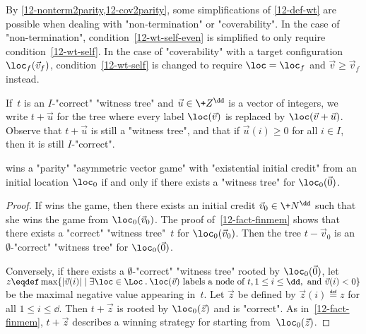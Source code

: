 \begin{remark}\label{12-rk-wt}
  By \cref{12-nonterm2parity,12-cov2parity}, some simplifications of
  \cref{12-def-wt} are possible when dealing with "non-termination" or
  "coverability". In the case of "non-termination",
  condition~\ref{12-wt-self-even} is simplified to only require
  condition~\ref{12-wt-self}.  In the case of "coverability" with a
  target configuration $\loc_f(\vec v_f)$, condition~\ref{12-wt-self}
  is changed to require $\loc=\loc_f$ and $\vec v\geq\vec v_f$
  instead.
\end{remark}

If~$t$ is an $I$-"correct" "witness tree" and $\vec u\in\+Z^\dd$ is a
vector of integers, we write $t+\vec u$ for the tree where
every label $\loc(\vec v)$ is replaced by $\loc(\vec v+\vec u)$.
Observe that $t+\vec u$ is still a "witness tree", and that if $\vec
u(i)\geq 0$ for all $i\in I$, then it is still $I$-"correct".

\begin{lemma}\label{12-lem-wt}
  \Eve wins a "parity" "asymmetric vector game" with "existential
  initial credit" from an initial location $\loc_0$ if and only if
  there exists a "witness tree" for $\loc_0(\vec 0)$.
\end{lemma}
\begin{proof}
  If \Eve wins the game, then there exists an initial credit
  $\vec v_0\in\+N^\dd$ such that she wins the game from
  $\loc_0(\vec v_0)$.  The proof of~\cref{12-fact-finmem} shows that
  there exists a "correct" "witness tree"~$t$ for $\loc_0(\vec v_0)$.
  Then the tree $t-\vec v_0$ is an $\emptyset$-"correct" "witness
  tree" for $\loc_0(\vec 0)$.

  Conversely, if there exists a $\emptyset$-"correct" "witness tree"
  rooted by $\loc_0(\vec 0)$, let
  $z\eqdef\max\{|\vec v(i)|\mid \exists\loc\in\Loc\mathbin.\loc(\vec
  v)\text{ labels a node of }t,1\leq i\leq \dd,\text{ and }\vec v(i)<0\}$
  be the maximal negative value appearing in~$t$.  Let $\vec z$ be
  defined by $\vec z(i)\eqdef z$ for all $1\leq i\leq\dd$.  Then
  $t+\vec z$ is rooted by $\loc_0(\vec z)$ and is "correct".  As
  in~\cref{12-fact-finmem}, $t+\vec z$ describes a winning strategy
  for \Eve starting from~$\loc_0(\vec z)$.
\end{proof}

